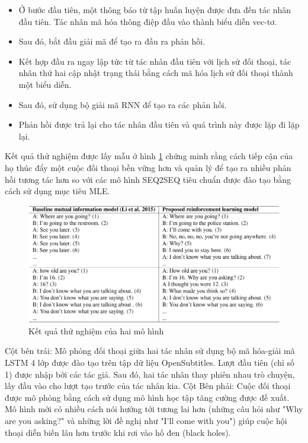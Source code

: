 \begin{itemize}
    \item Ở bước đầu tiên, một thông báo từ tập huấn luyện được đưa đến tác nhân đầu tiên. Tác nhân mã hóa thông điệp đầu vào thành biểu diễn vec-tơ.
    \item Sau đó, bắt đầu giải mã để tạo ra đầu ra phản hồi.
    \item Kết hợp đầu ra ngay lập tức từ tác nhân đầu tiên với lịch sử đối thoại, tác nhân thứ hai cập nhật trạng thái bằng cách mã hóa lịch sử đối thoại thành một biểu diễn.
    \item Sau đó, sử dụng bộ giải mã RNN để tạo ra các phản hồi.
    \item Phản hồi được trả lại cho tác nhân đầu tiên và quá trình này được lặp đi lặp lại.
\end{itemize}

Kết quả thử nghiệm được lấy mẫu ở hình \ref{fig:generationdialog} chứng minh rằng cách tiếp cận của họ thúc đẩy một cuộc đối thoại bền vững hơn và quản lý để tạo ra nhiều phản hồi tương tác hơn so với các mô hình SEQ2SEQ tiêu chuẩn được đào tạo bằng cách sử dụng mục tiêu MLE.

\begin{center}
    \begin{figure}[ht!]
        \begin{center}
         \includegraphics[scale=0.4]{chapter2/img/generationdialog.png}
        \end{center}
        \caption{Kết quả thử nghiệm của hai mô hình}
        \label{fig:generationdialog}
    \end{figure}
\end{center}

Cột bên trái: Mô phỏng đối thoại giữa hai tác nhân sử dụng bộ mã hóa-giải mã LSTM 4 lớp được đào tạo trên tập dữ liệu OpenSubtitles. Lượt đầu tiên (chỉ số 1) được nhập bởi các tác giả. Sau đó, hai tác nhân thay phiên nhau trò chuyện, lấy đầu vào cho lượt tạo trước của tác nhân kia. Cột Bên phải: Cuộc đối thoại được mô phỏng bằng cách sử dụng mô hình học tập tăng cường được đề xuất. Mô hình mới có nhiều cách nói hướng tới tương lai hơn (những câu hỏi như "Why are you asking?" và những lời đề nghị như "I'll come with you") giúp cuộc hội thoại diễn biến lâu hơn trước khi rơi vào hố đen (black holes).

